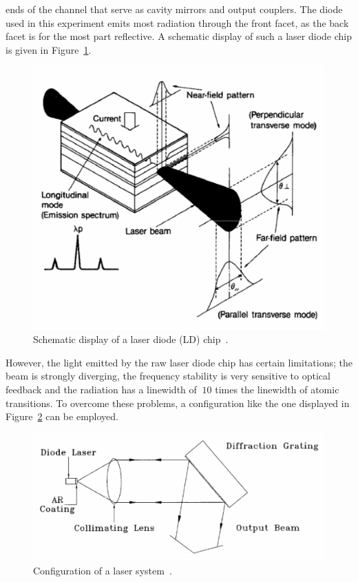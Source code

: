 ends of the channel that serve as cavity mirrors and output couplers. The diode used in this experiment emits most
radiation through the front facet, as the back facet is for the most part reflective. A schematic display of such a
laser diode chip is given in Figure~\ref{fig:diode}.
\begin{figure}[H]
  \centering
  \includegraphics[scale=0.4]{./pictures/Diode-schematisch.png}
 \caption{Schematic display of a laser diode (LD) chip~\cite{teachspin}.}
 \label{fig:diode}
\end{figure}
\noindent
However, the light emitted by the raw laser diode chip has certain limitations; the beam is strongly diverging,
the frequency stability is very sensitive to optical feedback and the radiation has a linewidth of $~10$ times the
linewidth of atomic transitions. To overcome these problems, a configuration like the one displayed in
Figure~\ref{fig:laser-system} can be employed.
\begin{figure}
  \centering
  \includegraphics[scale=0.4]{./pictures/Laser-system.png}
  \caption{Configuration of a laser system~\cite{teachspin}.}
  \label{fig:laser-system}
\end{figure}
